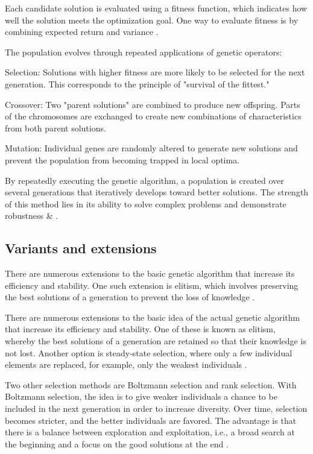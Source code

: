 \documentclass{agasthesis}
\begin{document}
Each candidate solution is evaluated using a fitness function, which indicates how well the solution meets the optimization goal. 
One way to evaluate fitness is by combining expected return and variance \cite[p. 206]{soldatos_big_2022}.

The population evolves through repeated applications of genetic operators:

Selection: Solutions with higher fitness are more likely to be selected for the next generation. 
This corresponds to the principle of "survival of the fittest."

Crossover: Two "parent solutions" are combined to produce new offspring. 
Parts of the chromosomes are exchanged to create new combinations of characteristics from both parent solutions.

Mutation: Individual genes are randomly altered to generate new solutions and prevent the population from becoming trapped in local optima.

\cite[p. 8]{melanie_introduction_1999}

By repeatedly executing the genetic algorithm, a population is created over several generations that iteratively develops toward better solutions. 
The strength of this method lies in its ability to solve complex problems and demonstrate robustness \cite[p. 27]{melanie_introduction_1999} & \cite[p. 213]{soldatos_big_2022}.

\subsection{Variants and extensions}
There are numerous extensions to the basic genetic algorithm that increase its efficiency and stability. 
One such extension is elitism, which involves preserving the best solutions of a generation to prevent the loss of knowledge \cite{deb_fast_2002}.

There are numerous extensions to the basic idea of the actual genetic algorithm that increase its efficiency and stability. 
One of these is known as elitism, whereby the best solutions of a generation are retained so that their knowledge is not lost. 
Another option is steady-state selection, where only a few individual elements are replaced, for example, only the weakest individuals \cite[p. 126-128]{melanie_introduction_1999}. 

Two other selection methods are Boltzmann selection and rank selection. With Boltzmann selection, the idea is to give weaker 
individuals a chance to be included in the next generation in order to increase diversity. Over time, selection becomes stricter, 
and the better individuals are favored. The advantage is that there is a balance between exploration and exploitation, i.e., 
a broad search at the beginning and a focus on the good solutions at the end \cite[p. 126-128]{melanie_introduction_1999}.
\end{document}

